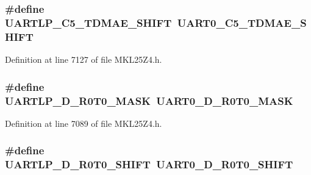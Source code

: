 \subsubsection[{\texorpdfstring{U\+A\+R\+T\+L\+P\+\_\+\+C5\+\_\+\+T\+D\+M\+A\+E\+\_\+\+S\+H\+I\+FT}{UARTLP_C5_TDMAE_SHIFT}}]{\setlength{\rightskip}{0pt plus 5cm}\#define U\+A\+R\+T\+L\+P\+\_\+\+C5\+\_\+\+T\+D\+M\+A\+E\+\_\+\+S\+H\+I\+FT~{\bf U\+A\+R\+T0\+\_\+\+C5\+\_\+\+T\+D\+M\+A\+E\+\_\+\+S\+H\+I\+FT}}\hypertarget{group___backward___compatibility___symbols_gac2909b753be3968e0878180017501e56}{}\label{group___backward___compatibility___symbols_gac2909b753be3968e0878180017501e56}


Definition at line 7127 of file M\+K\+L25\+Z4.\+h.

\subsubsection[{\texorpdfstring{U\+A\+R\+T\+L\+P\+\_\+\+D\+\_\+\+R0\+T0\+\_\+\+M\+A\+SK}{UARTLP_D_R0T0_MASK}}]{\setlength{\rightskip}{0pt plus 5cm}\#define U\+A\+R\+T\+L\+P\+\_\+\+D\+\_\+\+R0\+T0\+\_\+\+M\+A\+SK~{\bf U\+A\+R\+T0\+\_\+\+D\+\_\+\+R0\+T0\+\_\+\+M\+A\+SK}}\hypertarget{group___backward___compatibility___symbols_ga6c0de61b1bd7ca4438ffc57fe10550ef}{}\label{group___backward___compatibility___symbols_ga6c0de61b1bd7ca4438ffc57fe10550ef}


Definition at line 7089 of file M\+K\+L25\+Z4.\+h.

\subsubsection[{\texorpdfstring{U\+A\+R\+T\+L\+P\+\_\+\+D\+\_\+\+R0\+T0\+\_\+\+S\+H\+I\+FT}{UARTLP_D_R0T0_SHIFT}}]{\setlength{\rightskip}{0pt plus 5cm}\#define U\+A\+R\+T\+L\+P\+\_\+\+D\+\_\+\+R0\+T0\+\_\+\+S\+H\+I\+FT~{\bf U\+A\+R\+T0\+\_\+\+D\+\_\+\+R0\+T0\+\_\+\+S\+H\+I\+FT}}\hypertarget{group___backward___compatibility___symbols_gab2cd42b68d606b5ba4d1b496d41a9a1a}{}\label{group___backward___compatibility___symbols_gab2cd42b68d606b5ba4d1b496d41a9a1a}


